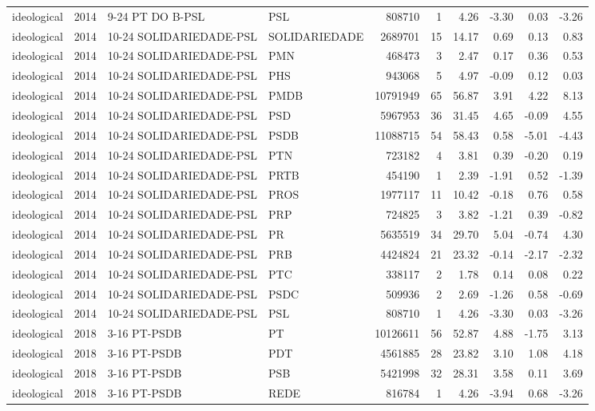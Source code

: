 \begin{landscape}
\begin{longtable}{lllL{2.8cm}rrrrrr}
ideological & 2014 & 9-24 PT DO B-PSL & PSL & 808710 & 1 & 4.26 & -3.30 & 0.03 & -3.26 \\
ideological & 2014 & 10-24 SOLIDARIEDADE-PSL & SOLIDARIEDADE & 2689701 & 15 & 14.17 & 0.69 & 0.13 & 0.83 \\
ideological & 2014 & 10-24 SOLIDARIEDADE-PSL & PMN & 468473 & 3 & 2.47 & 0.17 & 0.36 & 0.53 \\
ideological & 2014 & 10-24 SOLIDARIEDADE-PSL & PHS & 943068 & 5 & 4.97 & -0.09 & 0.12 & 0.03 \\
ideological & 2014 & 10-24 SOLIDARIEDADE-PSL & PMDB & 10791949 & 65 & 56.87 & 3.91 & 4.22 & 8.13 \\
ideological & 2014 & 10-24 SOLIDARIEDADE-PSL & PSD & 5967953 & 36 & 31.45 & 4.65 & -0.09 & 4.55 \\
ideological & 2014 & 10-24 SOLIDARIEDADE-PSL & PSDB & 11088715 & 54 & 58.43 & 0.58 & -5.01 & -4.43 \\
ideological & 2014 & 10-24 SOLIDARIEDADE-PSL & PTN & 723182 & 4 & 3.81 & 0.39 & -0.20 & 0.19 \\
ideological & 2014 & 10-24 SOLIDARIEDADE-PSL & PRTB & 454190 & 1 & 2.39 & -1.91 & 0.52 & -1.39 \\
ideological & 2014 & 10-24 SOLIDARIEDADE-PSL & PROS & 1977117 & 11 & 10.42 & -0.18 & 0.76 & 0.58 \\
ideological & 2014 & 10-24 SOLIDARIEDADE-PSL & PRP & 724825 & 3 & 3.82 & -1.21 & 0.39 & -0.82 \\
ideological & 2014 & 10-24 SOLIDARIEDADE-PSL & PR & 5635519 & 34 & 29.70 & 5.04 & -0.74 & 4.30 \\
ideological & 2014 & 10-24 SOLIDARIEDADE-PSL & PRB & 4424824 & 21 & 23.32 & -0.14 & -2.17 & -2.32 \\
ideological & 2014 & 10-24 SOLIDARIEDADE-PSL & PTC & 338117 & 2 & 1.78 & 0.14 & 0.08 & 0.22 \\
ideological & 2014 & 10-24 SOLIDARIEDADE-PSL & PSDC & 509936 & 2 & 2.69 & -1.26 & 0.58 & -0.69 \\
ideological & 2014 & 10-24 SOLIDARIEDADE-PSL & PSL & 808710 & 1 & 4.26 & -3.30 & 0.03 & -3.26 \\
ideological & 2018 & 3-16 PT-PSDB & PT & 10126611 & 56 & 52.87 & 4.88 & -1.75 & 3.13 \\
ideological & 2018 & 3-16 PT-PSDB & PDT & 4561885 & 28 & 23.82 & 3.10 & 1.08 & 4.18 \\
ideological & 2018 & 3-16 PT-PSDB & PSB & 5421998 & 32 & 28.31 & 3.58 & 0.11 & 3.69 \\
ideological & 2018 & 3-16 PT-PSDB & REDE & 816784 & 1 & 4.26 & -3.94 & 0.68 & -3.26 \\

\end{longtable}
\end{landscape}

